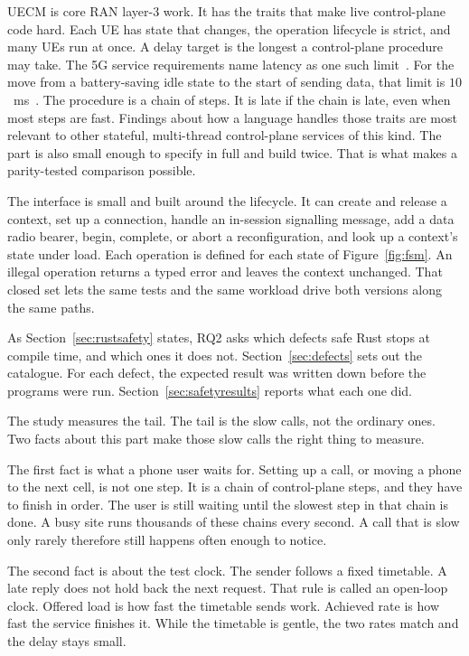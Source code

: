\documentclass[english,oneside,a4paper,censored,csm,software-track-2020]{HYthesisML}
\begin{document}
UECM is core RAN layer-3 work. It has the traits that make live control-plane
code hard. Each UE has state that changes, the operation lifecycle is strict,
and many UEs run at once. A delay target is the longest a control-plane procedure may take.
The 5G service requirements name latency as one such limit~\cite{3gpp22261}.
For the move from a battery-saving idle state to the start of sending data, that limit is $10$~ms~\cite{3gpp38913}.
The procedure is a chain of steps. It is late if the chain is late, even when most steps are fast.
Findings about how a language
handles those traits are most relevant to other stateful, multi-thread
control-plane services of this kind. The part is also small enough to specify in full and build twice.
That is what makes a parity-tested comparison possible.

The interface is small and built around the lifecycle. It can create and
release a context, set up a connection, handle an in-session signalling
message, add a data radio bearer, begin, complete, or abort a
reconfiguration, and look up a context's state under load. Each
operation is defined for each state of Figure~\ref{fig:fsm}. An illegal operation
returns a typed error and leaves the context unchanged. That closed set lets
the same tests and the same workload drive both versions along the same
paths.

As Section~\ref{sec:rustsafety} states, RQ2 asks which defects safe Rust stops at compile
time, and which ones it does not. Section~\ref{sec:defects} sets out the catalogue. For each defect, the expected
result was written down before the programs were run.
Section~\ref{sec:safetyresults} reports what each one did.

The study measures the tail. The tail is the slow calls, not the ordinary ones. Two facts
about this part make those slow calls the right thing to measure.

The first fact is what a phone user waits for. Setting up a call, or moving a phone to the
next cell, is not one step. It is a chain of control-plane steps, and they have to finish in
order. The user is still waiting until the slowest step in that chain is done. A busy site
runs thousands of these chains every second. A call that is slow only rarely therefore still
happens often enough to notice.

The second fact is about the test clock. The sender follows a fixed timetable. A late reply
does not hold back the next request. That rule is called an open-loop clock. Offered load
is how fast the timetable sends work. Achieved rate is how fast the service finishes it.
While the timetable is gentle, the two rates match and the delay stays small.
\end{document}
